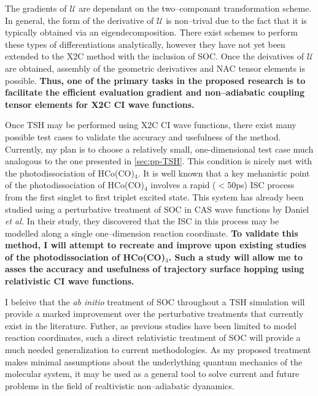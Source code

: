 The gradients of $\mathcal{U}$ are dependant on the two--componant
transformation scheme. In general, the form of the derivative of $\mathcal{U}$
is non--trival due to the fact that it is typically obtained via an
eigendecomposition.\cite{Dyall07_book,Reiher15_book} There exist schemes to perform these types of
differentiations analytically, 
\cite{Nakai16_JCTC2181,Cremer15_JCP214106,Gauss11_JCP084114}
however they have not yet been extended to the
X2C method with the inclusion of SOC.  Once the deivatives of $\mathcal{U}$ are
obtained, assembly of the geometric derivatives and NAC tensor elements is
possible. {\bf Thus, one of the primary tasks in the proposed research is to
facilitate the efficient evaluation gradient and non--adiabatic coupling tensor
elements for X2C CI wave functions.}

Once TSH may be performed using X2C CI wave functions, there exist many possible
test cases to validate the accuracy and usefulness of the method. Currently, my
plan is to choose a relatively small, one-dimensional test case much analogous
to the one presented in \cref{sec:pp-TSH}. This condition is nicely met with the
photodissociation of HCo(CO)$_4$. It is well known that a key mehanistic point
of the photodissociation of  HCo(CO)$_4$ involves a rapid ($<$50ps) ISC process
from the first singlet to first triplet excited state. \cite{Daniel97_JCP1421,
Daniel94_JPC9823} This system has already been studied using a perturbative
treatment of SOC in CAS wave functions by Daniel \emph{et al.}
\cite{Daniel97_JCP1421} In their study,
they discovered that the ISC in this process may be modelled along a single
one--dimension reaction coordinate.  {\bf To validate this method, I will
attempt to recreate and improve upon existing studies of the photodissociation
of HCo(CO)$_4$. Such a study will allow me to asses the accuracy and usefulness
of trajectory surface hopping using relativistic CI wave functions.}

I beleive that the \emph{ab initio} treatment of SOC throughout a TSH simulation
will provide a marked improvement over the perturbative treatments that
currently exist in the literature. Futher, as previous studies have been limited
to model reaction coordinates, such a direct relativistic treatment of SOC will
provide a much needed generalization to current methodologies. As my proposed
treatment makes minimal assumptions about the underlything quantum mechanics of
the molecular system, it may be used as a general tool to solve current and
future problems in the field of realtivistic non--adiabatic dyanamics.
